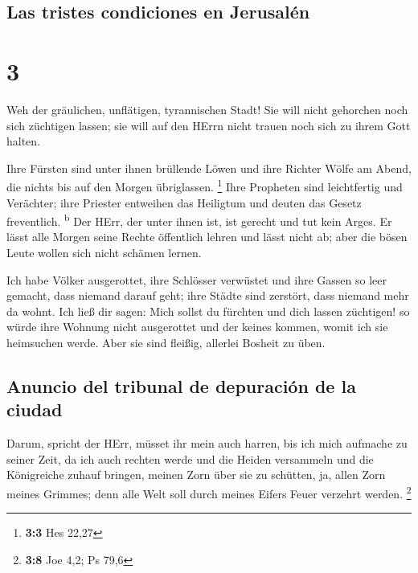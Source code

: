 \hypertarget{las-tristes-condiciones-en-jerusaluxe9n}{%
\subsection{Las tristes condiciones en
Jerusalén}\label{las-tristes-condiciones-en-jerusaluxe9n}}

\hypertarget{section-2}{%
\section{3}\label{section-2}}

 Weh der gräulichen, unflätigen, tyrannischen Stadt!
 Sie will nicht gehorchen noch sich züchtigen lassen; sie
will auf den HErrn nicht trauen noch sich zu ihrem Gott halten.

 Ihre Fürsten sind unter ihnen brüllende Löwen und ihre
Richter Wölfe am Abend, die nichts bis auf den Morgen übriglassen.
\footnote{\textbf{3:3} Hes 22,27}  Ihre Propheten sind
leichtfertig und Verächter; ihre Priester entweihen das Heiligtum und
deuten das Gesetz freventlich. \textsuperscript{b}  Der
HErr, der unter ihnen ist, ist gerecht und tut kein Arges. Er lässt alle
Morgen seine Rechte öffentlich lehren und lässt nicht ab; aber die bösen
Leute wollen sich nicht schämen lernen.

 Ich habe Völker ausgerottet, ihre Schlösser verwüstet und
ihre Gassen so leer gemacht, dass niemand darauf geht; ihre Städte sind
zerstört, dass niemand mehr da wohnt.  Ich ließ dir sagen:
Mich sollst du fürchten und dich lassen züchtigen! so würde ihre Wohnung
nicht ausgerottet und der keines kommen, womit ich sie heimsuchen werde.
Aber sie sind fleißig, allerlei Bosheit zu üben.

\hypertarget{anuncio-del-tribunal-de-depuraciuxf3n-de-la-ciudad}{%
\subsection{Anuncio del tribunal de depuración de la
ciudad}\label{anuncio-del-tribunal-de-depuraciuxf3n-de-la-ciudad}}

 Darum, spricht der HErr, müsset ihr mein auch harren, bis
ich mich aufmache zu seiner Zeit, da ich auch rechten werde und die
Heiden versammeln und die Königreiche zuhauf bringen, meinen Zorn über
sie zu schütten, ja, allen Zorn meines Grimmes; denn alle Welt soll
durch meines Eifers Feuer verzehrt werden. \footnote{\textbf{3:8} Joe
  4,2; Ps 79,6}

